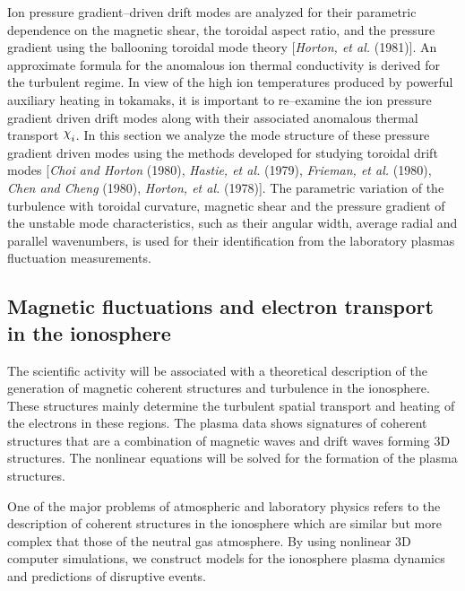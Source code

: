\documentclass[a4paper,openany,12pt]{book}
\def\chix{\raise.5ex\hbox{$\chi$}}
\begin{document}
Ion pressure gradient--driven drift modes are analyzed for their parametric dependence on the magnetic shear, the toroidal aspect ratio, and the pressure gradient using the ballooning toroidal mode theory [\emph{Horton, et al.} (1981)]. An approximate formula for the anomalous ion thermal conductivity is derived for the turbulent regime. In view of the 
high ion temperatures produced by powerful auxiliary heating in tokamaks, it is important to re--examine the ion pressure gradient driven drift modes along with their associated anomalous thermal transport $\chix_i$. In this section we analyze the mode structure of these pressure gradient driven modes using the methods developed for studying toroidal drift modes [\emph{Choi and Horton} (1980), \emph{Hastie, et al.} (1979), \emph{Frieman, et al.} (1980), \emph{Chen and Cheng} (1980), \emph{Horton, et al.} (1978)]. The parametric variation of the turbulence with toroidal curvature, magnetic shear and the pressure gradient of the unstable mode characteristics, such as their angular width, average radial and parallel wavenumbers, is used for their identification from the laboratory plasmas fluctuation measurements.

\subsection{Magnetic fluctuations and electron transport in the ionosphere}

The scientific activity will be associated with a theoretical description of the generation of magnetic coherent structures and turbulence in the ionosphere. These structures mainly determine the turbulent spatial transport and heating of the electrons in these regions. The plasma data shows signatures of coherent structures that are a combination of magnetic waves and drift waves forming 3D structures. The nonlinear equations will be solved for the formation of the plasma structures. 

One of the major problems of atmospheric and laboratory physics refers to the description of coherent structures in the ionosphere which are similar but more complex that those of the neutral gas atmosphere. By using nonlinear 3D computer simulations, we construct models for the ionosphere plasma dynamics and predictions of disruptive events. 
\end{document}
